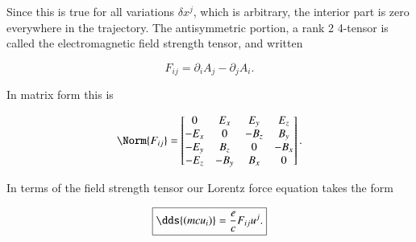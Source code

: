 Since this is true for all variations $\delta x^j$, which is arbitrary, the interior part is zero everywhere in the trajectory.  The antisymmetric portion, a rank 2 4-tensor is called the electromagnetic field strength tensor, and written

\begin{equation}\label{eqn:relativisticElectrodynamicsL10:350}
\boxed{
F_{ij} = \partial_i A_j - \partial_j A_i.
}
\end{equation}

In matrix form this is

\begin{equation}\label{eqn:relativisticElectrodynamicsL10:370}
\Norm{ F_{ij} } = 
\begin{bmatrix}
0 & E_x & E_y & E_z \\
-E_x & 0 & -B_z & B_y \\
-E_y & B_z & 0 & -B_x \\
-E_z & -B_y & B_x & 0
\end{bmatrix}.
\end{equation}

In terms of the field strength tensor our Lorentz force equation takes the form

\begin{equation}\label{eqn:relativisticElectrodynamicsL10:390}
\boxed{
\dds{(m c u_i)} = \frac{e}{c} F_{ij} u^j.
}
\end{equation}

\EndArticle
